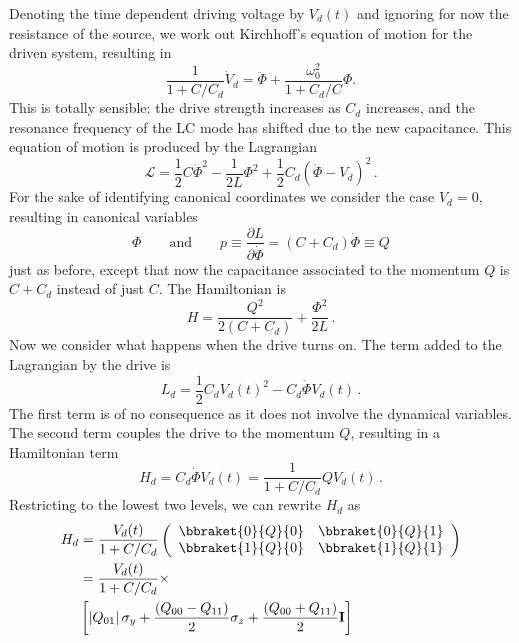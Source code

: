 Denoting the time dependent driving voltage by $V_d(t)$ and ignoring for now the resistance of the source, we work out Kirchhoff's equation of motion for the driven system, resulting in
\begin{equation}
\frac{1}{1+C/C_d} \dot{V}_d = \ddot{\Phi} + \frac{\omega_0^2}{1 + C_d/C} \Phi. \end{equation}
This is totally sensible: the drive strength increases as $C_d$ increases, and the resonance frequency of the LC mode has shifted due to the new capacitance.
This equation of motion is produced by the Lagrangian
\begin{equation}
\mathcal{L} = \frac{1}{2}C \dot{\Phi}^2 - \frac{1}{2L}\Phi^2 + \frac{1}{2} C_d \left( \dot{\Phi} - V_d \right)^2 \, .
\end{equation}
For the sake of identifying canonical coordinates we consider the case $V_d=0$, resulting in canonical variables
\begin{equation*}
  \Phi
  \qquad \textrm{and} \qquad
  p \equiv \frac{\partial L}{\partial \dot{\Phi}} = \left( C + C_d \right) \dot{\Phi} \equiv Q
\end{equation*}
just as before, except that now the capacitance associated to the momentum $Q$ is $C+C_d$ instead of just $C$.
The Hamiltonian is
\begin{equation}
H = \frac{Q^2}{2 (C + C_d)} + \frac{\Phi^2}{2L} \, .
\end{equation}
Now we consider what happens when the drive turns on.
The term added to the Lagrangian by the drive is
\begin{equation}
L_d = \frac{1}{2}C_d V_d(t)^2 - C_d \dot{\Phi} V_d(t) \, .
\end{equation}
The first term is of no consequence as it does not involve the dynamical variables.
The second term couples the drive to the momentum $Q$, resulting in a Hamiltonian term
\begin{equation*}
H_d
  = C_d \dot{\Phi}V_d(t)
  = \frac{1}{1+C/C_d} Q V_d(t) \, . \label{eq:sec:driving:H_dVsCircuitParams}
\end{equation*}
Restricting to the lowest two levels, we can rewrite $H_d$ as
\begin{align}
H_d
&= \frac{V_d(t)}{1 + C/C_d} \left(
{\begin{array}{cc}\bbraket{0}{Q}{0} & \bbraket{0}{Q}{1} \\ \bbraket{1}{Q}{0} & \bbraket{1}{Q}{1}\end{array}}
\right) \\
&= \frac{V_d(t)}{1 + C/C_d} \times \nonumber \\
&\left[
\left| Q_{01} \right| \sigma_y
+ \frac{\left( Q_{00} - Q_{11} \right)}{2} \sigma_z
+ \frac{\left( Q_{00} + Q_{11} \right)}{2} \mathbf{I}
\right]
\end{align}
